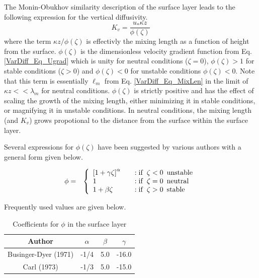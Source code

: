 The Monin-Obukhov similarity description of the surface layer leads to the following
expression for the vertical diffusivity.
\begin{equation}\label{VarDiff_Eq_Kz_Surf}
K_v = \frac{u_{*} \kappa z}{\phi(\zeta)}
\end{equation}
where the term $\kappa z / \phi(\zeta)$ is effectivly the mixing length as a function of height from the
surface. $\phi(\zeta)$ is the dimensionless velocity gradient 
function from Eq. \ref{VarDiff_Eq_Ugrad} which is unity for neutral conditions ($\zeta=0$),
$\phi(\zeta)>1$ for stable conditions ($\zeta>0$) and $\phi(\zeta)<0$ for unstable
conditions $\phi(\zeta)<0$.
Note that this term is essentially $\ell_m$ from Eq. \ref{VarDiff_Eq_MixLen} in the limit of
$\kappa z << \lambda_m$ for neutral conditions. $\phi(\zeta)$ is strictly positive and
has the effect of scaling the growth of the mixing length, either minimizing it in
stable conditions, or magnifying it in unstable conditions. In neutral conditions, the
mixing length (and $K_v$) grows propotional to the distance from the surface within the
surface layer. 

Several expressions for $\phi(\zeta)$ have been suggested by various authors with a
general form given below.

\begin{eqnarray}\label{VarDiff_Eq_PhiB}
\phi &=& \left\{ \begin{array} {l@{\quad \quad}l}
 \left[ 1+\gamma \zeta\right]^{\alpha}  &:  \mathrm{if}\,\,\, \zeta < 0 \,\,\, \mathrm{unstable} \\
1                                       &:  \mathrm{if}\,\,\, \zeta = 0 \,\,\, \mathrm{neutral} \\
1 + \beta \zeta                         &:  \mathrm{if}\,\,\, \zeta > 0 \,\,\, \mathrm{stable}
\end{array}
\right.
\end{eqnarray}

Frequently used values are given below.
\small
\begin{table}[htbp]
\begin{center}
\begin{tabular}{| c | c | c | c |}
\hline
Author & $\alpha$ & $\beta$ & $\gamma$\\
\hline
Businger-Dyer (1971)     & -1/4 & 5.0 & -16.0 \\
Carl (1973)              & -1/3 & 5.0 & -15.0 \\
\hline
\end{tabular}
\caption{\label{Tab_VarDiff_phisurf}Coefficients for $\phi$ in the surface layer}
\end{center}
\end{table}
\normalsize

